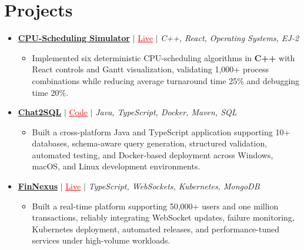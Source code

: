 \documentclass[letterpaper,10pt]{article}
\newcommand{\resumeItem}[1]{\item\small{{#1 \vspace{-3pt}}}}
\newcommand{\resumeProjectHeading}[1]{\item \small #1 \vspace{-2pt}}
\newcommand{\resumeProjectLink}[2]{\href{#1}{\textcolor{red}{\underline{#2}}}}
\newcommand{\resumeSubHeadingListStart}{\begin{itemize}[leftmargin=0.0in,label={}]}
\newcommand{\resumeSubHeadingListEnd}{\end{itemize}}
\newcommand{\resumeProjItemListStart}{\begin{itemize}[leftmargin=0.15in,label=\textbullet,itemsep=0pt,topsep=0pt,parsep=0pt,partopsep=0pt]}
\newcommand{\resumeProjItemListEnd}{\end{itemize}\vspace{1pt}}
\begin{document}
\section{Projects}
\resumeSubHeadingListStart
  \resumeProjectHeading{\href{https://cpu-scheduler-amber.vercel.app/}{\textbf{CPU-Scheduling Simulator}} $|$ \resumeProjectLink{https://cpu-scheduler-amber.vercel.app/}{Live} $|$ \emph{C++, React, Operating Systems, EJ-2}}
  \resumeProjItemListStart
    \resumeItem{Implemented six deterministic CPU-scheduling algorithms in \textbf{C++} with React controls and Gantt visualization, validating 1,000+ process combinations while reducing average turnaround time 25\% and debugging time 20\%.}
  \resumeProjItemListEnd
  \resumeProjectHeading{\href{https://github.com/SAHAJ-BHADJA/Chat2SQL}{\textbf{Chat2SQL}} $|$ \resumeProjectLink{https://github.com/SAHAJ-BHADJA/Chat2SQL}{Code} $|$ \emph{Java, TypeScript, Docker, Maven, SQL}}
  \resumeProjItemListStart
    \resumeItem{Built a cross-platform Java and TypeScript application supporting 10+ databases, schema-aware query generation, structured validation, automated testing, and Docker-based deployment across Windows, macOS, and Linux development environments.}
  \resumeProjItemListEnd
  \resumeProjectHeading{\href{https://fin-nexus.vercel.app/}{\textbf{FinNexus}} $|$ \resumeProjectLink{https://fin-nexus.vercel.app/}{Live} $|$ \emph{TypeScript, WebSockets, Kubernetes, MongoDB}}
  \resumeProjItemListStart
    \resumeItem{Built a real-time platform supporting 50,000+ users and one million transactions, reliably integrating WebSocket updates, failure monitoring, Kubernetes deployment, automated releases, and performance-tuned services under high-volume workloads.}
  \resumeProjItemListEnd
\resumeSubHeadingListEnd
\end{document}
